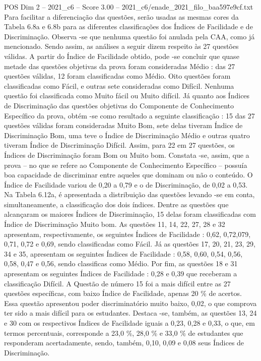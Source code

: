 \begin{textsample}{POS Dim 2 – 2021\_c6 – Score 3.00 – 2021\_c6/enade\_2021\_filo\_baa597e9cf.txt}
Para facilitar a diferenciação das questões, serão usadas as mesmas cores da Tabela 6.8a e 6.8b para as diferentes classificações dos Índices de Facilidade e de Discriminação.
Observa -se que nenhuma questão foi anulada pela CAA, como já mencionado.
Sendo assim, as análises a seguir dizem respeito às 27 questões válidas.
A partir do Índice de Facilidade obtido, pode -se concluir que quase metade das questões objetivas da prova foram consideradas Médio : das 27 questões válidas, 12 foram classificadas como Médio.
Oito questões foram classificadas como Fácil, e outras sete consideradas como Difícil.
Nenhuma questão foi classificada como Muito fácil ou Muito difícil.
Já quanto aos Índices de Discriminação das questões objetivas do Componente de Conhecimento Específico da prova, obtém -se como resultado a seguinte classificação : 15 das 27 questões válidas foram consideradas Muito Bom, sete delas tiveram Índice de Discriminação Bom, uma teve o Índice de Discriminação Médio e outras quatro tiveram Índice de Discriminação Difícil.
Assim, para 22 em 27 questões, os Índices de Discriminação foram Bom ou Muito bom.
Constata -se, assim, que a prova – no que se refere ao Componente de Conhecimento Específico – possuía boa capacidade de discriminar entre aqueles que dominam ou não o conteúdo.
O Índice de Facilidade variou de 0,20 a 0,79 e o de Discriminação, de 0,02 a 0,53.
Na Tabela 6.12a, é apresentada a distribuição das questões levando -se em conta, simultaneamente, a classificação dos dois índices.
Dentre as questões que alcançaram os maiores Índices de Discriminação, 15 delas foram classificadas com Índice de Discriminação Muito bom.
As questões 11, 14, 22, 27, 28 e 32 apresentam, respectivamente, os seguintes Índices de Facilidade : 0,62, 0,72,079, 0,71, 0,72 e 0,69, sendo classificadas como Fácil.
Já as questões 17, 20, 21, 23, 29, 34 e 35, apresentam os seguintes Índices de Facilidade : 0,58, 0,60, 0,54, 0,56, 0,58, 0,47 e 0,56, sendo classificas como Médio.
Por fim, as questões 18 e 31 apresentam os seguintes Índices de Facilidade : 0,28 e 0,39 que receberam a classificação Difícil.
A Questão de número 15 foi a mais difícil entre as 27 questões específicas, com baixo Índice de Facilidade, apenas 20 \% de acertos.
Essa questão apresentou poder discriminatório muito baixo, 0,02, o que comprova ter sido a mais difícil para os estudantes.
Destaca -se, também, as questões 13, 24 e 30 com os respectivos Índices de Facilidade iguais a 0,23, 0,28 e 0,33, o que, em termos percentuais, corresponde a 23,0 \%, 28,0 \% e 33,0 \% de estudantes que responderam acertadamente, sendo, também, 0,10, 0,09 e 0,08 seus Índices de Discriminação.

\end{textsample}
